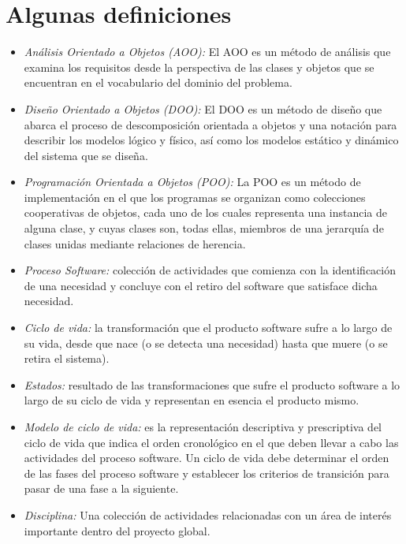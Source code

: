 \section{Algunas definiciones}
\begin{itemize}
    \item \emph{Análisis Orientado a Objetos (AOO):} El AOO es un método de análisis que examina los requisitos desde la perspectiva de las clases y objetos que se encuentran en el vocabulario del dominio del problema.
 
    \item \emph{Diseño Orientado a Objetos (DOO):} El DOO es un método de diseño que abarca el proceso de descomposición orientada a objetos y una notación para describir los modelos lógico y físico, así como los modelos estático y dinámico del sistema que se diseña.

    \item \emph{Programación Orientada a Objetos (POO):} La POO es un método de implementación en el que los programas se organizan como colecciones cooperativas de objetos, cada uno de los cuales representa una instancia de alguna clase, y cuyas clases son, todas ellas, miembros de una jerarquía de clases unidas mediante relaciones de herencia.

    \item \emph{Proceso Software:} colección de actividades que comienza con la identificación de una necesidad y concluye con el retiro del software que satisface dicha necesidad.

    \item \emph{Ciclo de vida:} la transformación que el producto software sufre a lo largo de su vida, desde que nace (o se detecta una necesidad) hasta que muere (o se retira el sistema).

    \item \emph{Estados:} resultado de las transformaciones que sufre el producto software a lo largo de su ciclo de vida y representan en esencia el producto mismo.

    \item \emph{Modelo de ciclo de vida:} es la representación descriptiva y prescriptiva del ciclo de vida que indica el orden cronológico en el que deben llevar a cabo las actividades del proceso software. Un ciclo de vida debe determinar el orden de las fases del proceso software y establecer los criterios de transición para pasar de una fase a la siguiente.
 
    \item \emph{Disciplina:} Una colección de actividades relacionadas con un área de interés importante dentro del proyecto global.
    
\end{itemize}

